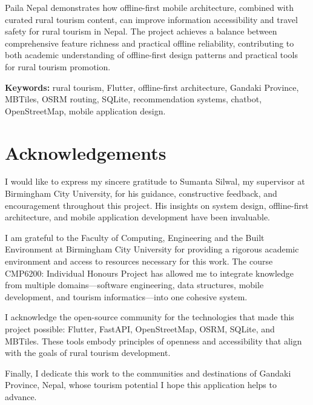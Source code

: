 \documentclass[12pt,a4paper,oneside]{report}
\begin{document}
Paila Nepal demonstrates how offline-first mobile architecture, combined with curated rural tourism content, can improve information accessibility and travel safety for rural tourism in Nepal. The project achieves a balance between comprehensive feature richness and practical offline reliability, contributing to both academic understanding of offline-first design patterns and practical tools for rural tourism promotion.

\textbf{Keywords:} rural tourism, Flutter, offline-first architecture, Gandaki Province, MBTiles, OSRM routing, SQLite, recommendation systems, chatbot, OpenStreetMap, mobile application design.

\newpage
\chapter*{Acknowledgements}

I would like to express my sincere gratitude to Sumanta Silwal, my supervisor at Birmingham City University, for his guidance, constructive feedback, and encouragement throughout this project. His insights on system design, offline-first architecture, and mobile application development have been invaluable.

I am grateful to the Faculty of Computing, Engineering and the Built Environment at Birmingham City University for providing a rigorous academic environment and access to resources necessary for this work. The course CMP6200: Individual Honours Project has allowed me to integrate knowledge from multiple domains---software engineering, data structures, mobile development, and tourism informatics---into one cohesive system.

I acknowledge the open-source community for the technologies that made this project possible: Flutter, FastAPI, OpenStreetMap, OSRM, SQLite, and MBTiles. These tools embody principles of openness and accessibility that align with the goals of rural tourism development.

Finally, I dedicate this work to the communities and destinations of Gandaki Province, Nepal, whose tourism potential I hope this application helps to advance.

\newpage
\tableofcontents
\newpage
\listoffigures
\newpage
\listoftables
\end{document}
